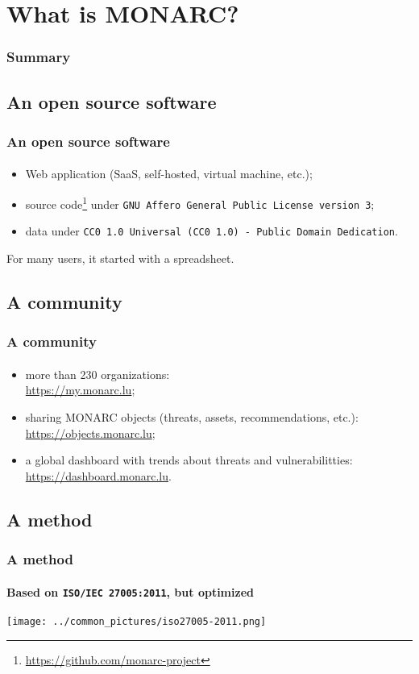 %
%
\section{What is MONARC?}
\begin{frame}
  \frametitle{Summary}
\end{frame}
\subsection{An open source software}
\begin{frame}
  \frametitle{An open source software}
  \framesubtitle{}
  \begin{itemize}
    \item Web application (SaaS, self-hosted, virtual machine, etc.);
    \item source code\footnote{\url{https://github.com/monarc-project}}
    under \texttt{GNU Affero General Public License version 3};
    \item data under \texttt{CC0 1.0 Universal (CC0 1.0) - Public Domain Dedication}.
  \end{itemize}
  \bigskip
  For many users, it started with a spreadsheet.
\end{frame}

\subsection{A community}
\begin{frame}
  \frametitle{A community}
  \framesubtitle{}
  \begin{itemize}
    \item more than 230 organizations:\\ \url{https://my.monarc.lu};
    \item sharing MONARC objects (threats, assets, recommendations, etc.):\\
    \url{https://objects.monarc.lu};
    \item a global dashboard with trends about threats and vulnerabilitties:\\
    \url{https://dashboard.monarc.lu}.
  \end{itemize}
\end{frame}

\subsection{A method}
\begin{frame}
  \frametitle{A method}
  \framesubtitle{Based on \texttt{ISO/IEC 27005:2011}, but optimized}
  \begin{center}
    \texttt{[image: ../common\_pictures/iso27005-2011.png]}
  \end{center}
\end{frame}
